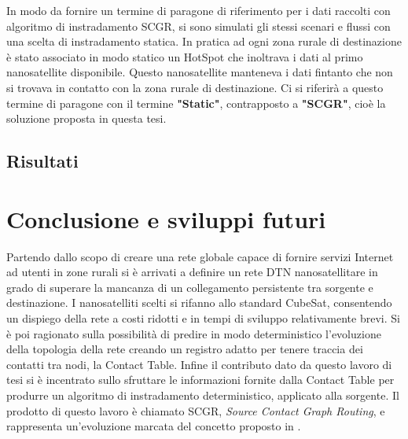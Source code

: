 \documentclass[12pt,a4paper,oneside]{book}
\begin{document}
		In modo da fornire un termine di paragone di riferimento per i dati raccolti con algoritmo di instradamento SCGR, si sono simulati gli stessi scenari e flussi con una scelta di instradamento statica. In pratica ad ogni zona rurale di destinazione è stato associato in modo statico un HotSpot che inoltrava i dati al primo nanosatellite disponibile. Questo nanosatellite manteneva i dati fintanto che non si trovava in contatto con la zona rurale di destinazione. Ci si riferirà a questo termine di paragone con il termine {\bf "Static"}, contrapposto a {\bf "SCGR"}, cioè la soluzione proposta in questa tesi.
			
		\section{Risultati}
		
	
	\chapter{Conclusione e sviluppi futuri}
	Partendo dallo scopo di creare una rete globale capace di fornire servizi Internet ad utenti in zone rurali si è arrivati a definire un rete DTN nanosatellitare in grado di superare la mancanza di un collegamento persistente tra sorgente e destinazione. I nanosatelliti scelti si rifanno allo standard CubeSat, consentendo un dispiego della rete a costi ridotti e in tempi di sviluppo relativamente brevi. Si è poi ragionato sulla possibilità di predire in modo deterministico l'evoluzione della topologia della rete creando un registro adatto per tenere traccia dei contatti tra nodi, la Contact Table. 
	Infine il contributo dato da questo lavoro di tesi si è incentrato sullo sfruttare le informazioni fornite dalla Contact Table per produrre un algoritmo di instradamento deterministico, applicato alla sorgente. Il prodotto di questo lavoro è chiamato SCGR, {\it Source Contact Graph Routing}, e rappresenta un'evoluzione marcata del concetto proposto in \cite{burleigh2010contact}.
	
\end{document}
